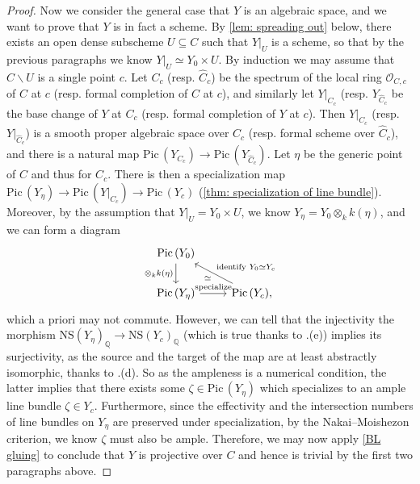 \documentclass[11pt, letterpaper]{amsart}
\theoremstyle{plain}
\theoremstyle{definition}
\newcommand{\IQ}{\mathbb{Q}}
\newcommand\tensor{{\otimes}}
\newcommand{\<}{\langle}
\renewcommand{\>}{\rangle}
\def\what{\widehat}
\newcommand{\Pic}{\mathrm{Pic}\,}
\newcommand{\sO}{\mathcal{O}}
\newcommand{\NS}{\mathrm{NS}}
\begin{document}
\begin{proof}
    Now we consider the general case that $Y$ is an algebraic space, and we want to prove that $Y$ is in fact a scheme.
    By \cref{lem: spreading out} below, there exists an open dense subscheme $U \subseteq C$ such that $Y|_U$ is a scheme, so that by the previous paragraphs we know $Y|_U \simeq Y_0 \times U$. 
    By induction we may assume that $C \smallsetminus U$ is a single point $c$. 
    Let $C_c$ (resp. $\what{C}_c$) be the spectrum of the local ring $\sO_{C, c}$ of $C$ at $c$ (resp. formal completion of $C$ at $c$), and similarly let  $Y|_{C_c}$ (resp. $Y_{\what{C}_c}$ be the base change of $Y$ at $C_c$ (resp. formal completion of $Y$ at $c$).
    Then $Y|_{C_c}$ (resp. $Y|_{\what{C}_c}$) is a smooth proper algebraic space over $C_c$ (resp. formal scheme over $\what{C}_c$), and there is a natural map $\Pic(Y_{C_c}) \to \Pic(Y_{\what{C}_c})$. 
    Let $\eta$ be the generic point of $C$ and thus for $C_c$. 
    There is then a specialization map $\Pic(Y_\eta) \to \Pic(Y|_{C_c}) \to \Pic(Y_c)$ (\cref{thm: specialization of line bundle}). 
    Moreover, by the assumption that $Y|_U = Y_0 \times U$, we know $Y_\eta = Y_0 \tensor_k k(\eta)$, and we can form a diagram
    \begin{equation}
        \label{eqn: triangle of specialization}
        \begin{tikzcd}
	{\Pic(Y_0) } \\
	{\Pic(Y_\eta)} & {\Pic(Y_c),}
	\arrow["{\tensor_k k(\eta)}"', from=1-1, to=2-1]
	\arrow["{\textrm{specialize}}", from=2-1, to=2-2]
	\arrow["{\textrm{identify }Y_0 \simeq Y_c}"', "\simeq", from=2-2, to=1-1]
    \end{tikzcd}
    \end{equation}
    which a priori may not commute.
    However, we can tell that the injectivity the morphism $\NS(Y_\eta)_\IQ \to \NS(Y_c)_\IQ$ (which is true thanks to .(e)) implies its surjectivity, as the source and the target of the map are at least abstractly isomorphic, thanks to .(d).
    So as the ampleness is a numerical condition, the latter implies that there exists some $\zeta \in \Pic(Y_\eta)$ which specializes to an ample line bundle $\zeta \in Y_c$. 
    Furthermore, since the effectivity and the intersection numbers of line bundles on $Y_\eta$ are preserved under specialization, by the Nakai--Moishezon criterion, we know $\zeta$ must also be ample.
    Therefore, we may now apply \cref{BL gluing} to conclude that $Y$ is projective over $C$ and hence is trivial by the first two paragraphs above. 
\end{proof} 
\end{document}
